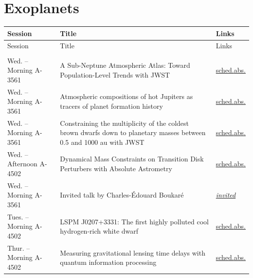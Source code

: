 \section*{Exoplanets}
{\small
\setlength{\emergencystretch}{1em}
\begin{longtable}{@{}>{\TableRaggedRight\arraybackslash\hspace{0pt}}p{} >{\TableRaggedRight\arraybackslash\hspace{0pt}}p{} >{\TableRaggedRight\arraybackslash\hspace{0pt}}p{}@{}}
\toprule
Session & Title & Links \\
\midrule
\endfirsthead
\toprule
Session & Title & Links \\
\midrule
\endhead
\addlinespace[0.15em]
\multicolumn{3}{@{}l}{\sffamily\bfseries\color{cascateal} Talks} \\
\addlinespace[0.1em]
Wed. -- Morning A-3561 & A Sub-Neptune Atmospheric Atlas: Toward Population-Level Trends with JWST & \hyperlink{schedule-talk-224}{sched.}\newline \hyperlink{abstract-talk-224}{abs.} \\
Wed. -- Morning A-3561 & Atmospheric compositions of hot Jupiters as tracers of planet formation history & \hyperlink{schedule-talk-82}{sched.}\newline \hyperlink{abstract-talk-82}{abs.} \\
Wed. -- Morning A-3561 & Constraining the multiplicity of the coldest brown dwarfs down to planetary masses between 0.5 and 1000 au with JWST & \hyperlink{schedule-talk-233}{sched.}\newline \hyperlink{abstract-talk-233}{abs.} \\
Wed. -- Afternoon A-4502 & Dynamical Mass Constraints on Transition Disk Perturbers with Absolute Astrometry & \hyperlink{schedule-talk-31}{sched.}\newline \hyperlink{abstract-talk-31}{abs.} \\
Wed. -- Morning A-3561 & Invited talk by Charles-Édouard Boukaré & \hyperlink{invited-charles-edouard-boukare}{\textit{invited}} \\
Tues. -- Morning A-4502 & LSPM J0207+3331: The first highly polluted cool hydrogen-rich white dwarf & \hyperlink{schedule-talk-26}{sched.}\newline \hyperlink{abstract-talk-26}{abs.} \\
Thur. -- Morning A-4502 & Measuring gravitational lensing time delays with quantum information processing & \hyperlink{schedule-talk-49}{sched.}\newline \hyperlink{abstract-talk-49}{abs.} \\

\end{longtable}}

